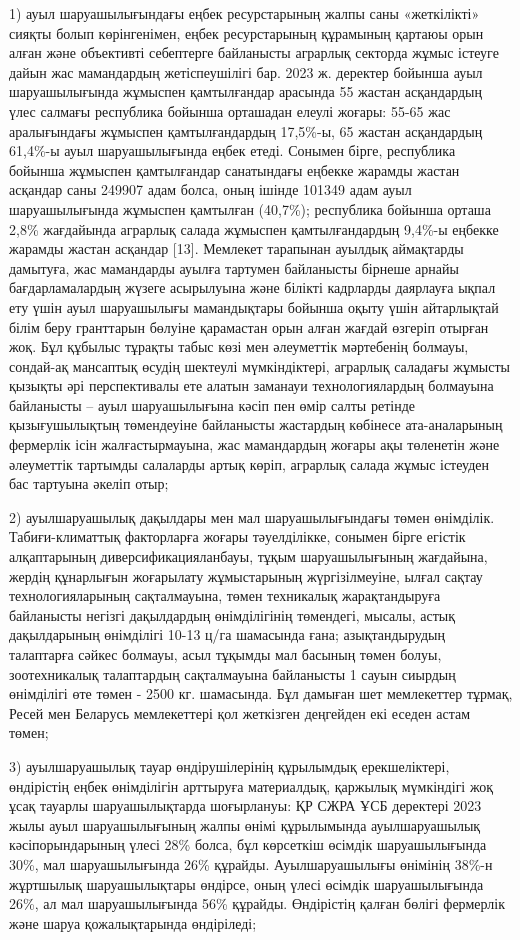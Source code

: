 {{1) ауыл шаруашылығындағы еңбек ресурстарының жалпы саны «жеткілікті»
сияқты болып көрінгенімен, еңбек ресурстарының құрамының қартаюы орын
алған және объективті себептерге байланысты аграрлық секторда жұмыс
істеуге дайын жас мамандардың жетіспеушілігі бар. 2023 ж. деректер
бойынша ауыл шаруашылығында жұмыспен қамтылғандар арасында 55 жастан
асқандардың үлес салмағы республика бойынша орташадан елеулі жоғары:
55-65 жас аралығындағы жұмыспен қамтылғандардың 17,5\%-ы, 65 жастан
асқандардың 61,4\%-ы ауыл шаруашылығында еңбек етеді. Сонымен бірге,
республика бойынша жұмыспен қамтылғандар санатындағы еңбекке жарамды
жастан асқандар саны 249907 адам болса, оның ішінде 101349 адам ауыл
шаруашылығында жұмыспен қамтылған (40,7\%); республика бойынша орташа
2,8\% жағдайында аграрлық салада жұмыспен қамтылғандардың 9,4\%-ы
еңбекке жарамды жастан асқандар {[}13{]}. Мемлекет тарапынан ауылдық
аймақтарды дамытуға, жас мамандарды ауылға тартумен байланысты бірнеше
арнайы бағдарламалардың жүзеге асырылуына және білікті кадрларды
даярлауға ықпал ету үшін ауыл шаруашылығы мамандықтары бойынша оқыту
үшін айтарлықтай білім беру гранттарын бөлуіне қарамастан орын алған
жағдай өзгеріп отырған жоқ. Бұл құбылыс тұрақты табыс көзі мен
әлеуметтік мәртебенің болмауы, сондай-ақ мансаптық өсудің шектеулі
мүмкіндіктері, аграрлық саладағы жұмысты қызықты әрі перспективалы ете
алатын заманауи технологиялардың болмауына байланысты -- ауыл
шаруашылығына кәсіп пен өмір салты ретінде қызығушылықтың төмендеуіне
байланысты жастардың көбінесе ата-аналарының фермерлік ісін
жалғастырмауына, жас мамандардың жоғары ақы төленетін және әлеуметтік
тартымды салаларды артық көріп, аграрлық салада жұмыс істеуден бас
тартуына әкеліп отыр;

2) ауылшаруашылық дақылдары мен мал шаруашылығындағы төмен өнімділік.
Табиғи-климаттық факторларға жоғары тәуелділікке, сонымен бірге егістік
алқаптарының диверсификацияланбауы, тұқым шаруашылығының жағдайына,
жердің құнарлығын жоғарылату жұмыстарының жүргізілмеуіне, ылғал сақтау
технологияларының сақталмауына, төмен техникалық жарақтандыруға
байланысты негізгі дақылдардың өнімділігінің төмендегі, мысалы, астық
дақылдарының өнімділігі 10-13 ц/га шамасында ғана; азықтандырудың
талаптарға сәйкес болмауы, асыл тұқымды мал басының төмен болуы,
зоотехникалық талаптардың сақталмауына байланысты 1 сауын сиырдың
өнімділігі өте төмен - 2500 кг. шамасында. Бұл дамыған шет мемлекеттер
тұрмақ, Ресей мен Беларусь мемлекеттері қол жеткізген деңгейден екі
еседен астам төмен;

3) ауылшаруашылық тауар өндірушілерінің құрылымдық ерекшеліктері,
өндірістің еңбек өнімділігін арттыруға материалдық, қаржылық мүмкіндігі
жоқ ұсақ тауарлы шаруашылықтарда шоғырлануы: ҚР СЖРА ҰСБ деректері 2023
жылы ауыл шаруашылығының жалпы өнімі құрылымында ауылшаруашылық
кәсіпорындарының үлесі 28\% болса, бұл көрсеткіш өсімдік шаруашылығында
30\%, мал шаруашылығында 26\% құрайды. Ауылшаруашылығы өнімінің 38\%-н
жұртшылық шаруашылықтары өндірсе, оның үлесі өсімдік шаруашылығында
26\%, ал мал шаруашылығында 56\% құрайды. Өндірістің қалған бөлігі
фермерлік және шаруа қожалықтарында өндіріледі;

}}
